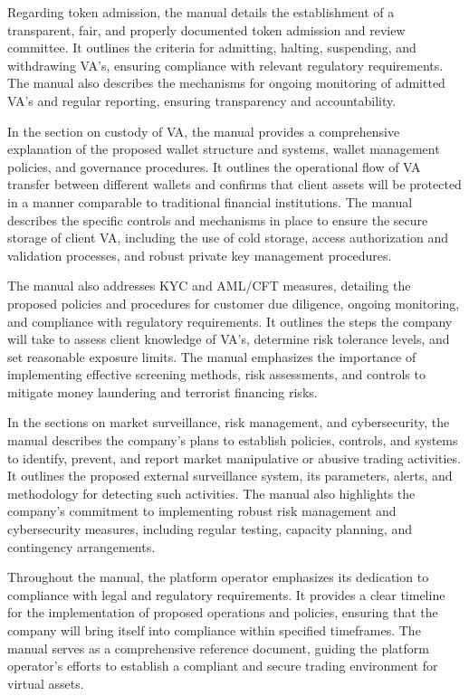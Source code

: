 \documentclass[]{report}
\begin{document}
Regarding token admission, the manual details the establishment of a
transparent, fair, and properly documented token admission and review
committee. It outlines the criteria for admitting, halting,
suspending, and withdrawing VA's, ensuring compliance with relevant
regulatory requirements. The manual also describes the mechanisms for
ongoing monitoring of admitted VA's and regular reporting, ensuring
transparency and accountability.

In the section on custody of VA, the manual provides a comprehensive
explanation of the proposed wallet structure and systems, wallet
management policies, and governance procedures. It outlines the
operational flow of VA transfer between different wallets and confirms
that client assets will be protected in a manner comparable to
traditional financial institutions. The manual describes the specific
controls and mechanisms in place to ensure the secure storage of
client VA, including the use of cold storage, access authorization and
validation processes, and robust private key management procedures.

The manual also addresses KYC and AML/CFT measures, detailing the
proposed policies and procedures for customer due diligence, ongoing
monitoring, and compliance with regulatory requirements. It outlines
the steps the company will take to assess client knowledge of VA's,
determine risk tolerance levels, and set reasonable exposure
limits. The manual emphasizes the importance of implementing effective
screening methods, risk assessments, and controls to mitigate money
laundering and terrorist financing risks.

In the sections on market surveillance, risk management, and
cybersecurity, the manual describes the company's plans to establish
policies, controls, and systems to identify, prevent, and report
market manipulative or abusive trading activities. It outlines the
proposed external surveillance system, its parameters, alerts, and
methodology for detecting such activities. The manual also highlights
the company's commitment to implementing robust risk management and
cybersecurity measures, including regular testing, capacity planning,
and contingency arrangements.

Throughout the manual, the platform operator emphasizes its dedication
to compliance with legal and regulatory requirements. It provides a
clear timeline for the implementation of proposed operations and
policies, ensuring that the company will bring itself into compliance
within specified timeframes. The manual serves as a comprehensive
reference document, guiding the platform operator's efforts to
establish a compliant and secure trading environment for virtual
assets.
\end{document}
